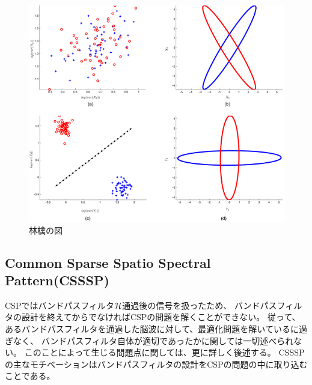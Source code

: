 \begin{figure}
    \centering
    \includegraphics[width=12cm]{images/apple.png}
    \caption{林檎の図}
\end{figure}
  

\subsection{Common Sparse Spatio Spectral Pattern(CSSSP)}
CSPではバンドパスフィルタ\(\cal H\)通過後の信号を扱ったため、
バンドパスフィルタの設計を終えてからでなければCSPの問題を解くことができない。
従って、あるバンドパスフィルタを通過した脳波に対して、最適化問題を解いているに過ぎなく、
バンドパスフィルタ自体が適切であったかに関しては一切述べられない。
このことによって生じる問題点に関しては、更に詳しく後述する。
CSSSPの主なモチベーションはバンドパスフィルタの設計をCSPの問題の中に取り込むことである\cite{csssp}。

